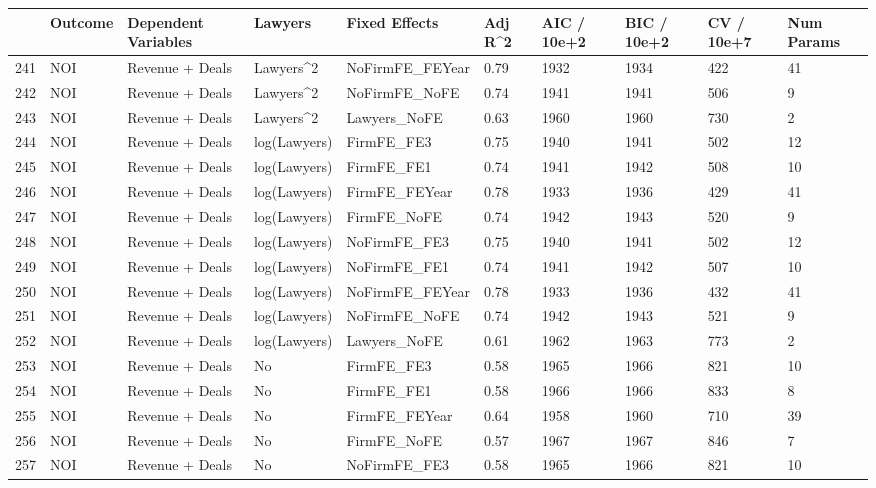 \documentclass{article}
\begin{document}
\begin{table}[H]
\centering
\begin{tabular}{rlllllllll}
  \hline
 & Outcome & Dependent Variables & Lawyers & Fixed Effects & Adj R^2 & AIC / 10e+2 & BIC / 10e+2 & CV / 10e+7 & Num Params \\ 
  \hline
241 & NOI & Revenue + Deals & Lawyers^2 & NoFirmFE\_FEYear & 0.79 & 1932 & 1934 & 422 & 41 \\ 
  242 & NOI & Revenue + Deals & Lawyers^2 & NoFirmFE\_NoFE & 0.74 & 1941 & 1941 & 506 & 9 \\ 
  243 & NOI & Revenue + Deals & Lawyers^2 & Lawyers\_NoFE & 0.63 & 1960 & 1960 & 730 & 2 \\ 
  244 & NOI & Revenue + Deals & log(Lawyers) & FirmFE\_FE3 & 0.75 & 1940 & 1941 & 502 & 12 \\ 
  245 & NOI & Revenue + Deals & log(Lawyers) & FirmFE\_FE1 & 0.74 & 1941 & 1942 & 508 & 10 \\ 
  246 & NOI & Revenue + Deals & log(Lawyers) & FirmFE\_FEYear & 0.78 & 1933 & 1936 & 429 & 41 \\ 
  247 & NOI & Revenue + Deals & log(Lawyers) & FirmFE\_NoFE & 0.74 & 1942 & 1943 & 520 & 9 \\ 
  248 & NOI & Revenue + Deals & log(Lawyers) & NoFirmFE\_FE3 & 0.75 & 1940 & 1941 & 502 & 12 \\ 
  249 & NOI & Revenue + Deals & log(Lawyers) & NoFirmFE\_FE1 & 0.74 & 1941 & 1942 & 507 & 10 \\ 
  250 & NOI & Revenue + Deals & log(Lawyers) & NoFirmFE\_FEYear & 0.78 & 1933 & 1936 & 432 & 41 \\ 
  251 & NOI & Revenue + Deals & log(Lawyers) & NoFirmFE\_NoFE & 0.74 & 1942 & 1943 & 521 & 9 \\ 
  252 & NOI & Revenue + Deals & log(Lawyers) & Lawyers\_NoFE & 0.61 & 1962 & 1963 & 773 & 2 \\ 
  253 & NOI & Revenue + Deals & No & FirmFE\_FE3 & 0.58 & 1965 & 1966 & 821 & 10 \\ 
  254 & NOI & Revenue + Deals & No & FirmFE\_FE1 & 0.58 & 1966 & 1966 & 833 & 8 \\ 
  255 & NOI & Revenue + Deals & No & FirmFE\_FEYear & 0.64 & 1958 & 1960 & 710 & 39 \\ 
  256 & NOI & Revenue + Deals & No & FirmFE\_NoFE & 0.57 & 1967 & 1967 & 846 & 7 \\ 
  257 & NOI & Revenue + Deals & No & NoFirmFE\_FE3 & 0.58 & 1965 & 1966 & 821 & 10 \\ 

\end{tabular}
\end{table}
\end{document}
